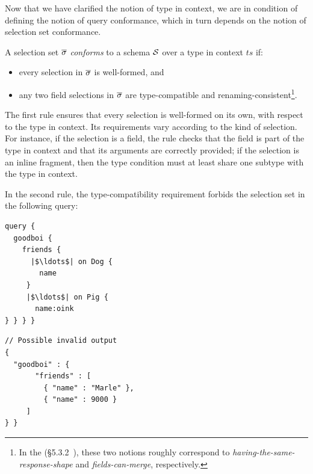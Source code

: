 
Now that we have clarified the notion of type in context, we are in
condition of defining the notion of query conformance, which in turn
depends on the notion of selection set conformance.

\begin{definition}
A \gql selection set $\overline{\sigma}$ \textit{conforms} to a schema $\mathcal{S}$ over a type in context $\mathit{ts}$ if:
\begin{itemize}
\item every selection in $\overline{\sigma}$ is  well-formed, and

\item any two field selections in $\overline{\sigma}$ are type-compatible and
  renaming-consistent\footnote{In the \spec
    (\cf\S5.3.2~\cite{gqlspec}), these two notions roughly correspond
    to \emph{having-the-same-response-shape} and
    \emph{fields-can-merge}, respectively.}.
       
\end{itemize}
\end{definition}

The first rule ensures that every selection is well-formed on its own, with
respect to the type in context. Its requirements vary according to the
kind of selection. For instance, if the selection is a field, the rule
checks that the field is part of the type in context and that its
arguments are correctly provided; if the selection is an inline
fragment, then the type condition must at least share one subtype with
the type in context.


In the second rule, the type-compatibility requirement forbids the
selection set in \eg the following query:

\begin{minipage}[t]{.22\textwidth}
\begin{verbatim}
query {
  goodboi {
    friends {
      |$\ldots$| on Dog {
        name
     }
     |$\ldots$| on Pig {
       name:oink
} } } }
\end{verbatim}
\end{minipage}%
\begin{minipage}[t]{.22\textwidth}
\begin{verbatim}
// Possible invalid output
{
  "goodboi" : {
       "friends" : [
         { "name" : "Marle" },
         { "name" : 9000 }
     ]
} }
\end{verbatim}
\end{minipage}

